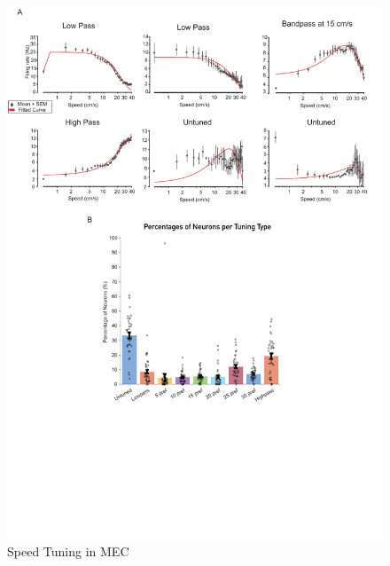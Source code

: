 \begin{figure}
    \centering
    \includegraphics[width=1\linewidth]{figures//Chapter 5 MEC/fig2_speed_tuning.pdf}
    \caption{Speed Tuning in MEC}
    \label{fig:placeholder}
\end{figure}